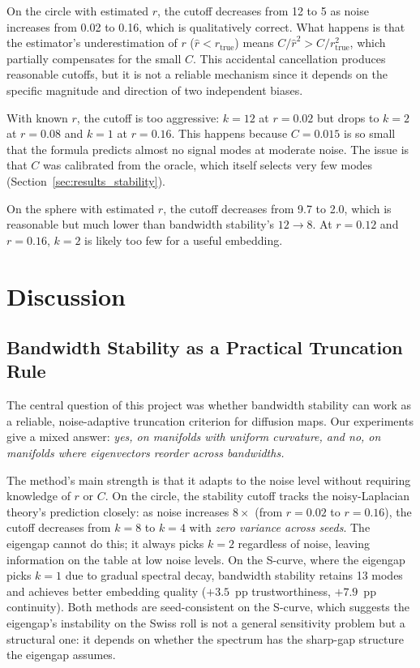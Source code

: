 \documentclass{article}
\begin{document}
On the circle with estimated $r$, the cutoff decreases from 12 to 5 as noise increases from 0.02 to 0.16, which is qualitatively correct. What happens is that the estimator's underestimation of $r$ ($\hat{r} < r_{\text{true}}$) means $C/\hat{r}^2 > C/r_{\text{true}}^2$, which partially compensates for the small $C$. This accidental cancellation produces reasonable cutoffs, but it is not a reliable mechanism since it depends on the specific magnitude and direction of two independent biases.

With known $r$, the cutoff is too aggressive: $k = 12$ at $r = 0.02$ but drops to $k = 2$ at $r = 0.08$ and $k = 1$ at $r = 0.16$. This happens because $C = 0.015$ is so small that the formula predicts almost no signal modes at moderate noise. The issue is that $C$ was calibrated from the oracle, which itself selects very few modes (Section~\ref{sec:results_stability}).

On the sphere with estimated $r$, the cutoff decreases from 9.7 to 2.0, which is reasonable but much lower than bandwidth stability's $12 \to 8$. At $r = 0.12$ and $r = 0.16$, $k = 2$ is likely too few for a useful embedding.

\clearpage
\section{Discussion}
\label{sec:discussion}

\subsection{Bandwidth Stability as a Practical Truncation Rule}

The central question of this project was whether bandwidth stability can work as a reliable, noise-adaptive truncation criterion for diffusion maps. Our experiments give a mixed answer: \emph{yes, on manifolds with uniform curvature, and no, on manifolds where eigenvectors reorder across bandwidths.}

The method's main strength is that it adapts to the noise level without requiring knowledge of $r$ or $C$. On the circle, the stability cutoff tracks the noisy-Laplacian theory's prediction closely: as noise increases $8\times$ (from $r = 0.02$ to $r = 0.16$), the cutoff decreases from $k = 8$ to $k = 4$ with \emph{zero variance across seeds}. The eigengap cannot do this; it always picks $k = 2$ regardless of noise, leaving information on the table at low noise levels. On the S-curve, where the eigengap picks $k = 1$ due to gradual spectral decay, bandwidth stability retains 13 modes and achieves better embedding quality ($+3.5$~pp trustworthiness, $+7.9$~pp continuity). Both methods are seed-consistent on the S-curve, which suggests the eigengap's instability on the Swiss roll is not a general sensitivity problem but a structural one: it depends on whether the spectrum has the sharp-gap structure the eigengap assumes.
\end{document}
